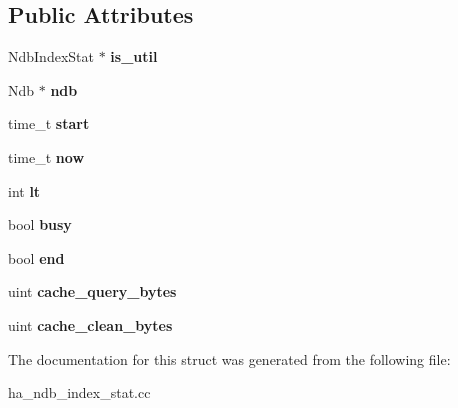 \subsection*{Public Attributes}
\begin{DoxyCompactItemize}
\item 
\mbox{\label{structNdb__index__stat__proc_aa6ab8c68eadd2d60241f803b895dcb88}} 
Ndb\+Index\+Stat $\ast$ {\bfseries is\+\_\+util}
\item 
\mbox{\label{structNdb__index__stat__proc_a2fd84f9102b04ca7975c618fef490442}} 
Ndb $\ast$ {\bfseries ndb}
\item 
\mbox{\label{structNdb__index__stat__proc_a62d9624c0271ed4f35fc6e8e89deb6eb}} 
time\+\_\+t {\bfseries start}
\item 
\mbox{\label{structNdb__index__stat__proc_a5ae76d2882ce3785c6875c3f87d4d05b}} 
time\+\_\+t {\bfseries now}
\item 
\mbox{\label{structNdb__index__stat__proc_a384119707ad7a2965d395d4872f22108}} 
int {\bfseries lt}
\item 
\mbox{\label{structNdb__index__stat__proc_a3716566ae2279d0e13e9a948dae172d2}} 
bool {\bfseries busy}
\item 
\mbox{\label{structNdb__index__stat__proc_ae591eed9f9a56a6232fb068ef0787440}} 
bool {\bfseries end}
\item 
\mbox{\label{structNdb__index__stat__proc_ad198dd41bb9631dd7e539679b2bdb0f8}} 
uint {\bfseries cache\+\_\+query\+\_\+bytes}
\item 
\mbox{\label{structNdb__index__stat__proc_a8a0471adc568c8283514a8f70b610eca}} 
uint {\bfseries cache\+\_\+clean\+\_\+bytes}
\end{DoxyCompactItemize}


The documentation for this struct was generated from the following file\+:\begin{DoxyCompactItemize}
\item 
ha\+\_\+ndb\+\_\+index\+\_\+stat.\+cc\end{DoxyCompactItemize}
